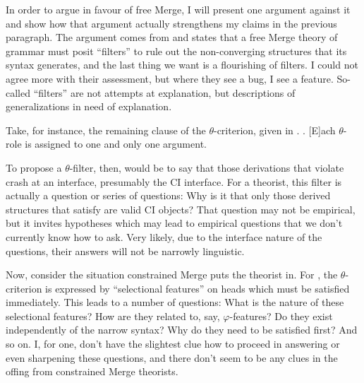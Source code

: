 In order to argue in favour of free Merge, I will present one argument against it and show how that argument actually strengthens my claims in the previous paragraph.
The argument comes from \textcite{frampton2008crash} and states that a free Merge theory of grammar must posit ``filters'' to rule out the non-converging structures that its syntax generates, and the last thing we want is a flourishing of filters.
I could not agree more with their assessment, but where they see a bug, I see a feature.
So-called ``filters'' are not attempts at explanation, but descriptions of generalizations in need of explanation.

Take, for instance, the remaining clause of the $\theta$-criterion, given in \Next.
\ex. [E]ach $\theta$-role is assigned to one and only one argument. \parencite[36]{chomsky1981lectures}

To propose a $\theta$-filter, then, would be to say that those derivations that violate \Last crash at an interface, presumably the CI interface.
For a theorist, this filter is actually a question or series of questions: Why is it that only those derived structures that satisfy \Last are valid CI objects?
That question may not be empirical, but it invites hypotheses which may lead to empirical questions that we don't currently know how to ask.
Very likely, due to the interface nature of the questions, their answers will not be narrowly linguistic.

Now, consider the situation constrained Merge puts the theorist in.
For \textcite{frampton2008crash}, the $\theta$-criterion is expressed by ``selectional features'' on heads which must be satisfied immediately.
This leads to a number of questions: What is the nature of these selectional features?
How are they related to, say, $\varphi$-features?
Do they exist independently of the narrow syntax?
Why do they need to be satisfied first?
And so on.
I, for one, don't have the slightest clue how to proceed in answering or even sharpening these questions, and there don't seem to be any clues in the offing from constrained Merge theorists.
